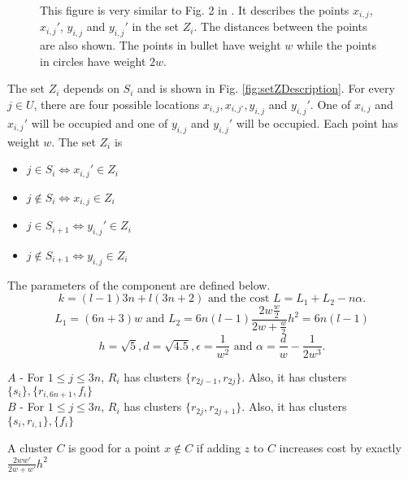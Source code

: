 \documentclass[orivec]{llncs}
\begin{document}
\begin{figure}
\center

\caption{This figure is very similar to Fig. 2 in \cite{vattani2009hardness}. It describes the points $x_{i,j}$, $x_{i,j}'$, $y_{i,j}$ and $y_{i,j}'$ in the set $Z_i$. The distances between the points are also shown. The points in bullet have weight $w$ while the points in circles have weight $2w$.}
\label{fig:ZFig}
\end{figure}

The set $Z_i$ depends on $S_i$ and is shown in Fig. \ref{fig:setZDescription}.  For every $j\in U$, there are four possible locations $x_{i, j}, x_{i,j'}, y_{i,j}$ and $y_{i, j}'$. One of $x_{i,j}$ and $x_{i,j}'$ will be occupied and one of $y_{i,j}$ and $y_{i,j}'$ will be occupied. Each point has weight $w$. The set $Z_i$ is
\begin{itemize}[nolistsep,noitemsep]
\item $j \in S_i \iff x_{i,j}' \in Z_i$
\item $j \not\in S_i \iff x_{i,j} \in Z_i$
\item $j \in S_{i+1} \iff y_{i,j}' \in Z_i$
\item $j \not\in S_{i+1} \iff y_{i,j} \in Z_i$

\end{itemize}
The parameters of the component are defined below. $$k = (l-1)3n + l(3n+2) \text{ and the cost }L = L_1 + L_2 -n\alpha.$$
$$L_1 = (6n+3)w \text{ and } L_2 = 6n(l-1)\frac{2w\frac{w}{2}}{2w+\frac{w}{2}}h^2 = 6n(l-1)$$
$$h = \sqrt{5}, d = \sqrt{4.5}, \epsilon = \frac{1}{w^2} \text{ and } \alpha = \frac{d}{w}-\frac{1}{2w^3}.$$

\begin{definition}
\label{defn:abclusteringVattani}
\noindent $A$ - For $1 \le j \le 3n$, $R_i$ has clusters $\{r_{2j-1}, r_{2j}\}$. Also, it has clusters $\{s_i\}, \{r_{i, 6n+1}, f_i\}$\\
\noindent $B$ - For $1 \le j \le 3n$, $R_i$ has clusters $\{r_{2j}, r_{2j+1}\}$. Also, it has clusters $\{s_i, r_{i, 1}\}, \{f_i\}$
\end{definition}

\begin{definition}
\label{defn:goodPointVattani}
A cluster $C$ is good for a point $x \not\in C$ if adding $z$ to $C$ increases cost by exactly $\frac{2ww'}{2w+w'}h^2$ 
\end{definition}
\end{document}
